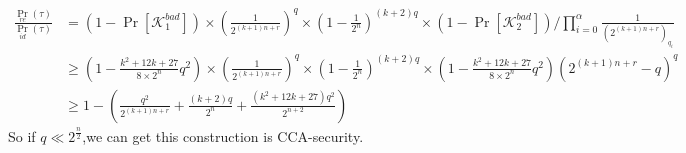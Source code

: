 \documentclass{article}
\begin{document}
\begin{align*}
\frac{\Pr_{re}(\tau)}{\Pr_{id}(\tau)}&= (1-\Pr[\mathcal{K}_{1}^{bad}])\times(\frac{1}{2^{(k+1)n+r}})^{q}\times(1-\frac{1}{2^{n}})^{(k+2)q}\times
(1-\Pr[\mathcal{K}_{2}^{bad}]) / \prod_{i=0}^{\alpha}\frac{1}{(2^{(k+1)n+r})_{q_{i}}}\\
&\geq (1-\frac{k^{2}+12k+27}{8\times2^{n}}q^{2})\times(\frac{1}{2^{(k+1)n+r}})^{q}\times(1-\frac{1}{2^{n}})^{(k+2)q}\times
(1-\frac{k^{2}+12k+27}{8\times2^{n}}q^{2})(2^{(k+1)n+r}-q)^{q}\\
 &\geq 1-( \frac{q^{2}}{2^{(k+1)n+r}}+\frac{(k+2)q}{2^{n}} +\frac{(k^{2}+12k+27)q^{2}}{2^{n+2}})
\end{align*}
So if $q \ll 2^{\frac{n}{2}}$,we can get this construction is CCA-security.\\



\end{document}

